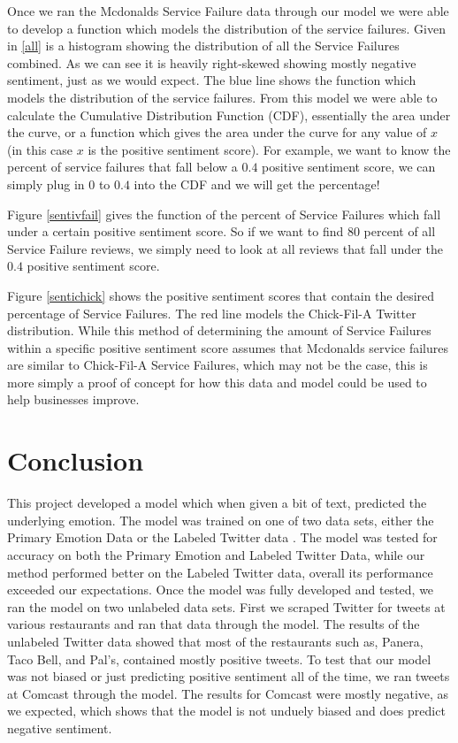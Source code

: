 \documentclass[titlepage,letterpaper]{article}
\begin{document}
Once we ran the Mcdonalds Service Failure data through our model we were able to develop a function which models the distribution of the service failures. Given in \cref{all} is a histogram showing the distribution of all the Service Failures combined. As we can see it is heavily right-skewed showing mostly negative sentiment, just as we would expect. The blue line shows the function which models the distribution of the service failures. From this model we were able to calculate the Cumulative Distribution Function (CDF), essentially the area under the curve, or a function which gives the area under the curve for any value of $x$ (in this case $x$ is the positive sentiment score). For example, we want to know the percent of service failures that fall below a $0.4$ positive sentiment score, we can simply plug in $0$ to $0.4$ into the CDF and we will get the percentage! 

Figure \ref{sentivfail} gives the function of the percent of Service Failures which fall under a certain positive sentiment score. So if we want to find $80$ percent of all Service Failure reviews, we simply need to look at all reviews that fall under the $0.4$ positive sentiment score. 

Figure \ref{sentichick} shows the positive sentiment scores that contain the desired percentage of Service Failures. The red line models the Chick-Fil-A Twitter distribution. While this method of determining the amount of Service Failures within a specific positive sentiment score assumes that Mcdonalds service failures are similar to Chick-Fil-A Service Failures, which may not be the case, this is more simply a proof of concept for how this data and model could be used to help businesses improve.  

\section{Conclusion}
This project developed a model which when given a bit of text, predicted the underlying emotion. The model was trained on one of two data sets, either the Primary Emotion Data \cite{lowriwilliams} or the Labeled Twitter data \cite{LabeledTwitter}. The model was tested for accuracy on both the Primary Emotion and Labeled Twitter Data, while our method performed better on the Labeled Twitter data, overall its performance exceeded our expectations. Once the model was fully developed and tested, we ran the model on two unlabeled data sets. First we scraped Twitter for tweets at various restaurants and ran that data through the model. The results of the unlabeled Twitter data showed that most of the restaurants such as, Panera, Taco Bell, and Pal's, contained mostly positive tweets. To test that our model was not biased or just predicting positive sentiment all of the time, we ran tweets at Comcast through the model. The results for Comcast were mostly negative, as we expected, which shows that the model is not unduely biased and does predict negative sentiment. 
\end{document}
